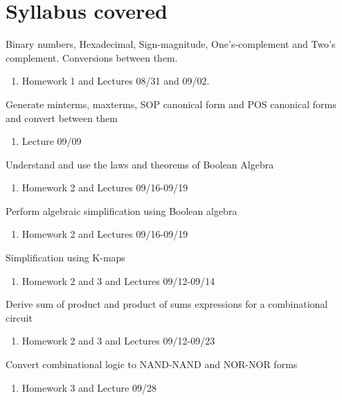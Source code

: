 \documentclass[options]{article}
\newcommand{\cmark}{\ding{51}}%
\newcommand{\done}{\rlap{$\square$}{\raisebox{2pt}{\large\hspace{1pt}\cmark}}%
  \hspace{-2.5pt}}
\begin{document}
\section{Syllabus covered}
\begin{todolist}
  \item[\done] Binary numbers, Hexadecimal, Sign-magnitude, One's-complement and
    Two's complement. Conversions between them.
    \begin{enumerate}
      \item Homework 1 and Lectures 08/31 and 09/02.
    \end{enumerate}
  \item[\done] Generate minterms, maxterms, SOP canonical form and POS
    canonical forms and convert between them\\
  \begin{enumerate}
    \item Lecture 09/09
  \end{enumerate}
  \item[\done]  Understand and use the laws and theorems of Boolean Algebra
  \begin{enumerate}
    \item Homework 2 and Lectures 09/16-09/19
  \end{enumerate}
  \item[\done]  Perform algebraic simplification using Boolean algebra
  \begin{enumerate}
    \item Homework 2 and Lectures 09/16-09/19
  \end{enumerate}
  \item[\done]  Simplification using K-maps
    \begin{enumerate}
    \item Homework 2 and 3 and Lectures 09/12-09/14
    \end{enumerate}
  \item[\done]  Derive sum of product and product of sums expressions for a combinational circuit
    \begin{enumerate}
    \item Homework 2 and 3 and Lectures 09/12-09/23
    \end{enumerate}
  \item[\done]  Convert combinational logic to NAND-NAND and NOR-NOR forms
    \begin{enumerate}
      \item Homework 3 and Lecture 09/28 
    \end{enumerate}

\end{todolist}
\end{document}
